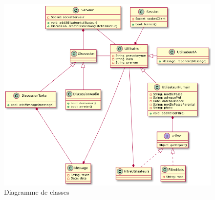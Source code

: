 \documentclass[a4paper,12pt]{article}
\begin{document}
\begin{figure}[H]
	\centerline{\includegraphics[width=16.5cm]{diagClassServeur.png}}
	\caption{Diagramme de classes}
\end{figure}
\end{document}
